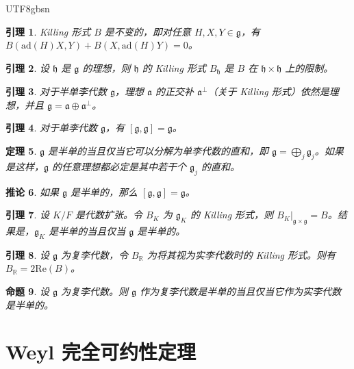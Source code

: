 \documentclass[11pt]{article}
\newtheorem{theorem}{定理}[section]
\newtheorem{lemma}[theorem]{引理}
\newtheorem{proposition}[theorem]{命题}
\newtheorem{corollary}[theorem]{推论}
\begin{document}
\begin{CJK*}{UTF8}{gbsn}
\begin{lemma}
Killing 形式 $B$ 是不变的，即对任意 $H, X, Y \in \mathfrak{g}$，有 $B(\mathrm{ad}(H)X, Y) + B(X, \mathrm{ad}(H)Y) = 0$。
\end{lemma}

\begin{lemma}
设 $\mathfrak{h}$ 是 $\mathfrak{g}$ 的理想，则 $\mathfrak{h}$ 的 Killing 形式 $B_{\mathfrak{h}}$ 是 $B$ 在 $\mathfrak{h} \times \mathfrak{h}$ 上的限制。
\end{lemma}

\begin{lemma}
对于半单李代数 $\mathfrak{g}$，理想 $\mathfrak{a}$ 的正交补 $\mathfrak{a}^\perp$（关于 Killing 形式）依然是理想，并且 $\mathfrak{g} = \mathfrak{a} \oplus \mathfrak{a}^\perp$。
\end{lemma}

\begin{lemma}
对于单李代数 $\mathfrak{g}$，有 $[\mathfrak{g}, \mathfrak{g}] = \mathfrak{g}$。
\end{lemma}

\begin{theorem}
$\mathfrak{g}$ 是半单的当且仅当它可以分解为单李代数的直和，即 $\mathfrak{g} = \bigoplus_j \mathfrak{g}_j$。如果是这样，$\mathfrak{g}$ 的任意理想都必定是其中若干个 $\mathfrak{g}_j$ 的直和。
\end{theorem}

\begin{corollary}
如果 $\mathfrak{g}$ 是半单的，那么 $[\mathfrak{g}, \mathfrak{g}] = \mathfrak{g}$。
\end{corollary}

\begin{lemma}
设 $K/F$ 是代数扩张。令 $B_K$ 为 $\mathfrak{g}_K$ 的 Killing 形式，则 $B_K|_{\mathfrak{g}\times\mathfrak{g}} = B$。结果是，$\mathfrak{g}_K$ 是半单的当且仅当 $\mathfrak{g}$ 是半单的。
\end{lemma}

\begin{lemma}
设 $\mathfrak{g}$ 为复李代数，令 $B_{\mathbb{R}}$ 为将其视为实李代数时的 Killing 形式。则有 $B_{\mathbb{R}} = 2\mathrm{Re}(B)$。
\end{lemma}

\begin{proposition}
设 $\mathfrak{g}$ 为复李代数。则 $\mathfrak{g}$ 作为复李代数是半单的当且仅当它作为实李代数是半单的。
\end{proposition}

\section{Weyl 完全可约性定理}


\end{CJK*}
\end{document}
